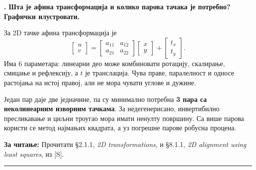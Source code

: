 \documentclass[10pt,a4paper]{article}
\newcommand{\en}[1]{\textit{#1}}
\newcounter{pitanje}
\newenvironment{odgovor}[1]{\stepcounter{pitanje}\begin{minipage}[t][0.455\textheight][t]{\textwidth}\vspace{0pt}\textbf{\thepitanje. #1}\par\smallskip}{\end{minipage}\par\ifodd\value{pitanje}\vspace{0.025\textheight}\hrule\vspace{0.015\textheight}\else\newpage\fi}
\newcommand{\izvor}[1]{\par\vfill{\footnotesize\textbf{За читање:} #1}\par}
\begin{document}
\begin{odgovor}{Шта је афина трансформација и колико парова тачака је потребно? Графички илустровати.}
За 2D тачке афина трансформација је
\[
\begin{bmatrix}u\\v\end{bmatrix}
=\begin{bmatrix}a_{11}&a_{12}\\a_{21}&a_{22}\end{bmatrix}
\begin{bmatrix}x\\y\end{bmatrix}
+\begin{bmatrix}t_x\\t_y\end{bmatrix}.
\]
Има 6 параметара: линеарни део може комбиновати ротацију, скалирање, смицање и рефлексију, а $t$ је транслација. Чува праве, паралелност и односе растојања на истој правој, али не мора чувати углове и дужине.
\begin{center}\end{center}
Један пар даје две једначине, па су минимално потребна \textbf{3 пара са неколинеарним изворним тачкама}. За недегенерисано, инвертибилно пресликавање и циљни троугао мора имати ненулту површину. Са више парова користи се метод најмањих квадрата, а уз погрешне парове робусна процена.
\izvor{Прочитати §2.1.1, \en{2D transformations}, и §8.1.1, \en{2D alignment using least squares}, из [S].}
\end{odgovor}
\end{document}
